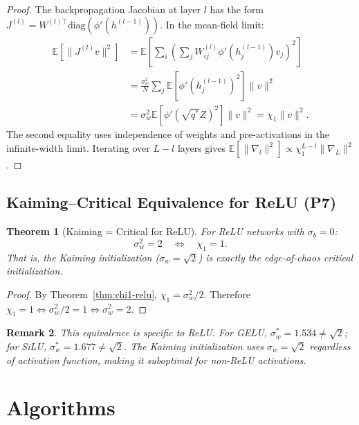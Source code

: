 \documentclass[10pt]{article}
\newcommand{\EE}{\mathbb{E}}
\newtheorem{theorem}{Theorem}
\newtheorem{remark}[theorem]{Remark}
\begin{document}
\begin{proof}
The backpropagation Jacobian at layer $l$ has the form $J^{(l)} = W^{(l)\top} \text{diag}(\phi'(h^{(l-1)}))$.
In the mean-field limit:
\begin{align}
    \EE[\|J^{(l)} v\|^2] &= \EE\left[\sum_i \left(\sum_j W_{ij}^{(l)} \phi'(h_j^{(l-1)}) v_j\right)^2\right] \\
    &= \frac{\sigma_w^2}{N} \sum_j \EE[\phi'(h_j^{(l-1)})^2] \|v\|^2 \\
    &= \sigma_w^2 \EE[\phi'(\sqrt{q^*} Z)^2] \|v\|^2 = \chi_1 \|v\|^2.
\end{align}
The second equality uses independence of weights and pre-activations in the infinite-width limit.
Iterating over $L-l$ layers gives $\EE[\|\nabla_l\|^2] \propto \chi_1^{L-l} \|\nabla_L\|^2$.
\end{proof}

\subsection{Kaiming--Critical Equivalence for ReLU (P7)}

\begin{theorem}[Kaiming = Critical for ReLU]
\label{thm:kaiming-critical}
For ReLU networks with $\sigma_b = 0$:
\[
\sigma_w^2 = 2 \quad \Longleftrightarrow \quad \chi_1 = 1.
\]
That is, the Kaiming initialization ($\sigma_w = \sqrt{2}$) is exactly the edge-of-chaos critical initialization.
\end{theorem}

\begin{proof}
By Theorem~\ref{thm:chi1-relu}, $\chi_1 = \sigma_w^2/2$.
Therefore $\chi_1 = 1 \Leftrightarrow \sigma_w^2/2 = 1 \Leftrightarrow \sigma_w^2 = 2$.
\end{proof}

\begin{remark}
This equivalence is specific to ReLU.
For GELU, $\sigma_w^* = 1.534 \neq \sqrt{2}$; for SiLU, $\sigma_w^* = 1.677 \neq \sqrt{2}$.
The Kaiming initialization uses $\sigma_w = \sqrt{2}$ regardless of activation function, making it suboptimal for non-ReLU activations.
\end{remark}

\section{Algorithms}
\label{app:algorithms}
\end{document}
